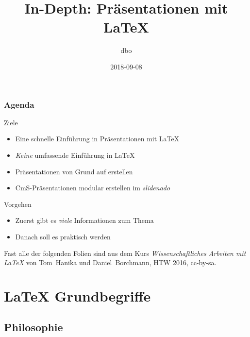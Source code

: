 \documentclass{cms-kurs}
\begin{document}
\title{In-Depth: Präsentationen mit \LaTeX{}}
\author{dbo}
\date{2018-09-08}

\maketitle{}

\begin{frame}
  \frametitle{Agenda}

  \onslide<+->

  \vfill

  \begin{block}{Ziele}
    \begin{itemize}
    \item Eine schnelle Einführung in Präsentationen mit \LaTeX{}
    \item \emph{Keine} umfassende Einführung in \LaTeX{}
    \item Präsentationen von Grund auf erstellen
    \item CmS-Präsentationen modular erstellen im \emph{slidenado}
    \end{itemize}
  \end{block}

  \vfill

  \onslide<+->

  \begin{block}{Vorgehen}
    \begin{itemize}
    \item Zuerst gibt es \emph{viele} Informationen zum Thema
    \item Danach soll es praktisch werden
    \end{itemize}
  \end{block}

  \bigskip{}

  \onslide<+->

  Fast alle der folgenden Folien sind aus dem Kurs \emph{Wissenschaftliches
    Arbeiten mit \LaTeX} von Tom~Hanika und Daniel~Borchmann, HTW 2016,
  cc-by-sa.

\end{frame}

\section{\LaTeX{} Grundbegriffe}

\subsection{Philosophie}
\end{document}
